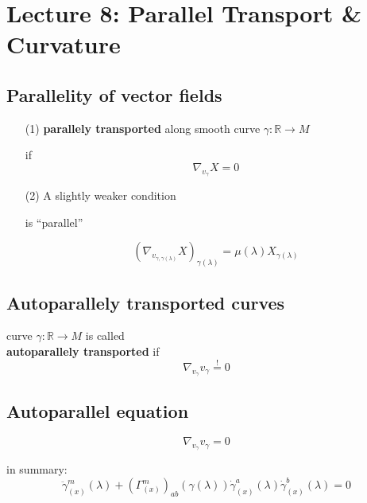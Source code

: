 \section{Lecture 8: Parallel Transport \& Curvature}

\subsection{Parallelity of vector fields}

\begin{definition}
\begin{enumerate}
\item[(1)]  \textbf{parallely transported} along smooth curve $\gamma: \mathbb{R} \to M$  

if 
\begin{equation}
  \boxed{ \nabla_{ v_{\gamma} } X = 0 }
\end{equation}
\item[(2)] A slightly weaker condition 

is ``parallel''

\[
( \nabla_{v_{\gamma, \gamma(\lambda)} } X)_{\gamma(\lambda)} = \mu(\lambda) X_{\gamma(\lambda)}
\]


\end{enumerate}
\end{definition}

\subsection{Autoparallely transported curves}

\begin{definition}
curve $\gamma: \mathbb{R} \to M$ is called \\
\textbf{autoparallely transported} if 
\begin{equation}
  \nabla_{v_{\gamma}}v_{\gamma} \overset{!}{=} 0
\end{equation}
\end{definition}


\subsection{Autoparallel equation}

\[
\nabla_{v_{\gamma}} v_{\gamma} =0 
\]

in summary:
\begin{equation}
  \ddot{\gamma}^m_{(x)}(\lambda) + (\Gamma^m_{(x)})_{ab}(\gamma(\lambda)) \dot{\gamma}^a_{(x)}(\lambda) \dot{\gamma}^b_{(x)}(\lambda) = 0 
\end{equation}

